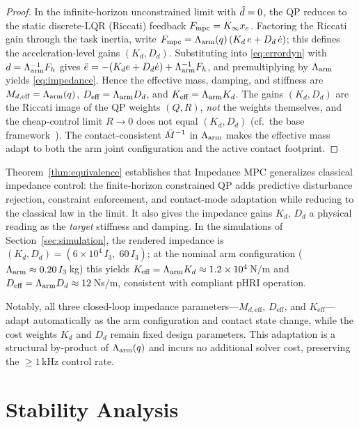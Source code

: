\begin{proof}
In the infinite-horizon unconstrained limit with $\hat{d}=0$, the QP reduces to
the static discrete-LQR (Riccati) feedback $F_{\text{mpc}}=K_\infty x_e$. Factoring the
Riccati gain through the task inertia, write
$F_{\text{mpc}}=\Lambda_{\text{arm}}(q)\,(K_d\,e+D_d\,\dot e)$; this defines the acceleration-level
gains $(K_d,D_d)$. Substituting into \eqref{eq:errordyn} with
$d=\Lambda_{\text{arm}}^{-1}F_h$ gives
$\ddot e=-(K_d e+D_d\dot e)+\Lambda_{\text{arm}}^{-1}F_h$, and premultiplying by $\Lambda_{\text{arm}}$
yields \eqref{eq:impedance}. Hence the effective mass, damping, and stiffness
are $M_{d,\text{eff}}=\Lambda_{\text{arm}}(q)$, $D_{\text{eff}}=\Lambda_{\text{arm}} D_d$, and
$K_{\text{eff}}=\Lambda_{\text{arm}} K_d$.
The gains $(K_d,D_d)$ are the Riccati image of the QP weights $(Q,R)$, \emph{not}
the weights themselves, and the cheap-control limit $R\to0$ does not equal
$(K_d,D_d)$ (cf.\ the base framework~\cite{cao2026impedance}).
The contact-consistent $\bar{M}^{-1}$ in $\Lambda_{\text{arm}}$ makes the effective mass adapt to
both the arm joint configuration and the active contact footprint.
\end{proof}

Theorem~\ref{thm:equivalence} establishes that Impedance MPC generalizes
classical impedance control: the finite-horizon constrained QP adds
predictive disturbance rejection, constraint enforcement, and contact-mode
adaptation while reducing to the classical law in the limit.
It also gives the impedance gains $K_d$, $D_d$ a physical reading as the
\emph{target} stiffness and damping.
In the simulations of Section~\ref{sec:simulation},
the rendered impedance is $(K_d,D_d)=(6\times10^4\,I_3,\;60\,I_3)$; at the
nominal arm configuration ($\Lambda_{\text{arm}}\approx0.20\,I_3$\,kg) this yields
$K_{\text{eff}}=\Lambda_{\text{arm}} K_d\approx1.2\times10^4$\,N/m and
$D_{\text{eff}}=\Lambda_{\text{arm}} D_d\approx12$\,Ns/m, consistent with compliant pHRI
operation.

Notably, all three closed-loop impedance parameters---$M_{d,\text{eff}}$,
$D_{\text{eff}}$, and $K_{\text{eff}}$---adapt automatically as the arm
configuration and contact state change, while the cost weights $K_d$ and
$D_d$ remain fixed design parameters.
This adaptation is a structural by-product of $\Lambda_{\text{arm}}(q)$ and incurs no
additional solver cost, preserving the ${\geq}1$\,kHz control rate.

\section{Stability Analysis}\label{sec:stability}

